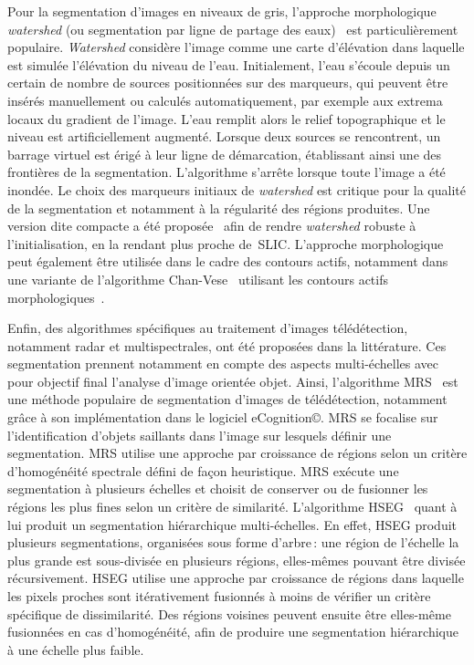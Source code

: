 Pour la segmentation d'images en niveaux de gris, l'approche morphologique \emph{watershed} (ou segmentation par ligne de partage des eaux)~\cite{beucher_morphological_1993} est particulièrement populaire. \emph{Watershed} considère l'image comme une carte d'élévation dans laquelle est simulée l'élévation du niveau de l'eau. Initialement, l'eau s'écoule depuis un certain de nombre de sources positionnées sur des marqueurs, qui peuvent être insérés manuellement ou calculés automatiquement, par exemple aux extrema locaux du gradient de l'image. L'eau remplit alors le relief topographique et le niveau est artificiellement augmenté. Lorsque deux sources se rencontrent, un barrage virtuel est érigé à leur ligne de démarcation, établissant ainsi une des frontières de la segmentation. L'algorithme s'arrête lorsque toute l'image a été inondée. Le choix des marqueurs initiaux de \emph{watershed} est critique pour la qualité de la segmentation et notamment à la régularité des régions produites. Une version dite compacte a été proposée~\cite{neubert_compact_2014} afin de rendre \emph{watershed} robuste à l'initialisation, en la rendant plus proche de~\gls{SLIC}. L'approche morphologique peut également être utilisée dans le cadre des contours actifs, notamment dans une variante de l'algorithme Chan-Vese~\cite{chan_active_1999} utilisant les contours actifs morphologiques~\cite{marquez-neila_morphological_2014}.

Enfin, des algorithmes spécifiques au traitement d'images télédétection, notamment radar et multispectrales, ont été proposées dans la littérature. Ces segmentation prennent notamment en compte des aspects multi-échelles avec pour objectif final l'analyse d'image orientée objet. Ainsi, l'algorithme \gls{MRS}~\cite{baatz_multiresolution_2000} est une méthode populaire de segmentation d'images de télédétection, notamment grâce à son implémentation dans le logiciel eCognition\copyright. \gls{MRS} se focalise sur l'identification d'objets saillants dans l'image sur lesquels définir une segmentation. \gls{MRS} utilise une approche par croissance de régions selon un critère d'homogénéité spectrale défini de façon heuristique. \gls{MRS} exécute une segmentation à plusieurs échelles et choisit de conserver ou de fusionner les régions les plus fines selon un critère de similarité.
L'algorithme \gls{HSEG}~\cite{tilton_best_2012} quant à lui produit un segmentation hiérarchique multi-échelles. En effet, \gls{HSEG} produit plusieurs segmentations, organisées sous forme d'arbre\,: une région de l'échelle la plus grande est sous-divisée en plusieurs régions, elles-mêmes pouvant être divisée récursivement. \gls{HSEG} utilise une approche par croissance de régions dans laquelle les pixels proches sont itérativement fusionnés à moins de vérifier un critère spécifique de dissimilarité. Des régions voisines peuvent ensuite être elles-même fusionnées en cas d'homogénéité, afin de produire une segmentation hiérarchique à une échelle plus faible.

